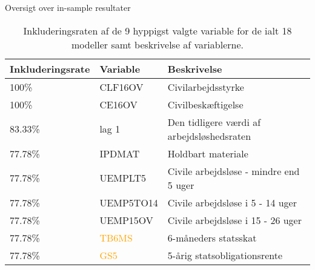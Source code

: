\begin{frame}{Oversigt over in-sample resultater}
\begin{table}[ht] 
\centering 
\begin{tabular}{lll}
\toprule 
Inkluderingsrate & Variable & Beskrivelse \\ \midrule
100\% &\textcolor{blue3}{CLF16OV} & Civilarbejdsstyrke \\
100\% &\textcolor{blue3}{CE16OV} & Civilbeskæftigelse \\
83.33\% & \textcolor{blue3}{lag 1} & Den tidligere værdi af arbejdsløshedsraten \\
77.78\% & \textcolor{chartreuse4}{IPDMAT} & Holdbart materiale  \\
77.78\% & \textcolor{blue3}{UEMPLT5} & Civile arbejdsløse - mindre end 5 uger \\
77.78\% & \textcolor{blue3}{UEMP5TO14}& Civile arbejdsløse i 5 - 14 uger \\
77.78\% & \textcolor{blue3}{UEMP15OV} &  Civile arbejdsløse i 15 - 26 uger  \\
77.78\% & \textcolor{orange}{TB6MS} & 6-måneders statsskat  \\
77.78\% & \textcolor{orange}{GS5} & 5-årig statsobligationsrente \\
\bottomrule
\end{tabular}  
\caption{Inkluderingsraten af de 9 hyppigst valgte variable for de ialt 18 modeller samt beskrivelse af variablerne.}
\end{table} 
\end{frame}



